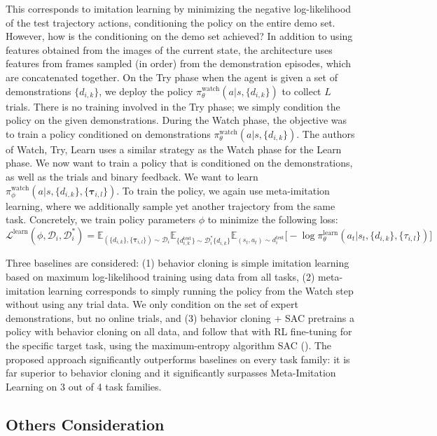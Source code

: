 \documentclass[
  letterpaper,
  numbers=noenddot,
  DIV=11]{scrreprt}
\theoremstyle{plain}
\theoremstyle{definition}
\theoremstyle{remark}
\begin{document}
This corresponds to imitation learning by minimizing the negative
log-likelihood of the test trajectory actions, conditioning the policy
on the entire demo set. However, how is the conditioning on the demo set
achieved? In addition to using features obtained from the images of the
current state, the architecture uses features from frames sampled (in
order) from the demonstration episodes, which are concatenated together.
On the Try phase when the agent is given a set of demonstrations
\(\{d_{i,k}\}\), we deploy the policy
\(\pi_\theta^{\text{watch}}(a | s, \{d_{i,k}\})\) to collect \(L\)
trials. There is no training involved in the Try phase; we simply
condition the policy on the given demonstrations. During the Watch
phase, the objective was to train a policy conditioned on demonstrations
\(\pi_\theta^{\text{watch}}(a | s, \{d_{i,k}\})\). The authors of Watch,
Try, Learn uses a similar strategy as the Watch phase for the Learn
phase. We now want to train a policy that is conditioned on the
demonstrations, as well as the trials and binary feedback. We want to
learn
\(\pi_\phi^{\text{watch}}(a | s, \{d_{i,k}\}, \{\mathbf{\tau}_{i, l}\})\).
To train the policy, we again use meta-imitation learning, where we
additionally sample yet another trajectory from the same task.
Concretely, we train policy parameters \(\phi\) to minimize the
following loss:
\[\mathcal{L}^{\text{learn}}(\phi, \mathcal{D}_i, \mathcal{D}_i^*) = \mathbb{E}_{(\{d_{i,k}\}, \{\mathbf{\tau}_{i,l}\}) \sim \mathcal{D}_i} \mathbb{E}_{\{d_{i,k}^{\text{test}}\} \sim \mathcal{D}_i^* \{d_{i,k}\}} \mathbb{E}_{(s_t, a_t) \sim d_i^{\text{test}}} \big[- \log \pi_\theta^{\text{learn}} (a_t | s_t, \{d_{i,k}\}, \{\tau_{i,l}\}) \big]\]

Three baselines are considered: (1) behavior cloning is simple imitation
learning based on maximum log-likelihood training using data from all
tasks, (2) meta-imitation learning corresponds to simply running the
policy from the Watch step without using any trial data. We only
condition on the set of expert demonstrations, but no online trials, and
(3) behavior cloning + SAC pretrains a policy with behavior cloning on
all data, and follow that with RL fine-tuning for the specific target
task, using the maximum-entropy algorithm SAC
(). The proposed
approach significantly outperforms baselines on every task family: it is
far superior to behavior cloning and it significantly surpasses
Meta-Imitation Learning on 3 out of 4 task families.

\subsection{Others Consideration}\label{others-consideration}
\end{document}
